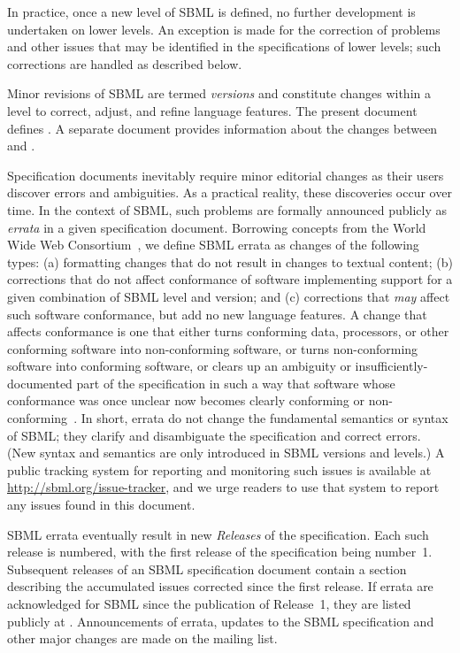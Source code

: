 In practice, once a new level of SBML is defined, no further
development is undertaken on lower levels.  An exception is made
for the correction of problems and other issues that may be
identified in the specifications of lower levels; such corrections
are handled as described below.

Minor revisions of SBML are termed \emph{versions} and constitute
changes within a level to correct, adjust, and refine language
features.  The present document defines \thisL \emph{\thisV}.  A separate
document provides information about the changes between \sbmlthree
and \sbmltwo.

Specification documents inevitably require minor editorial changes
as their users discover errors and ambiguities.  As a practical
reality, these discoveries occur over time.  In the context of
SBML, such problems are formally announced publicly as
\emph{errata} in a given specification document.  Borrowing
concepts from the World Wide Web Consortium~\citep{jacobs:2004},
we define SBML errata as changes of the following types: (a)
formatting changes that do not result in changes to textual
content; (b) corrections that do not affect conformance of
software implementing support for a given combination of SBML
level and version; and (c) corrections that \emph{may} affect such
software conformance, but add no new language features.  A change
that affects conformance is one that either turns conforming data,
processors, or other conforming software into non-conforming
software, or turns non-conforming software into conforming
software, or clears up an ambiguity or insufficiently-documented
part of the specification in such a way that software whose
conformance was once unclear now becomes clearly conforming or
non-conforming~\citep{jacobs:2004}.  In short, errata do not
change the fundamental semantics or syntax of SBML; they clarify
and disambiguate the specification and correct errors.  (New
syntax and semantics are only introduced in SBML versions and
levels.)  A public tracking system for reporting and
monitoring such issues is available at
\url{http://sbml.org/issue-tracker}, and we urge readers to use
that system to report any issues found in this document.

SBML errata eventually result in new \emph{Releases} of the
specification.  Each such release is numbered, with the first
release of the specification being number~1.  Subsequent releases
of an SBML specification document contain a section describing the
accumulated issues corrected since the first release.  If errata
are acknowledged for SBML \thisLV since the publication of
Release~1, they are listed publicly at
.
Announcements of errata, updates to the SBML specification and
other major changes are made on the
 mailing list.


